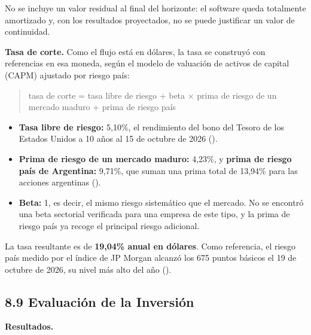 No se incluye un valor residual al final del horizonte: el software
queda totalmente amortizado y, con los resultados proyectados, no se
puede justificar un valor de continuidad.

\textbf{Tasa de corte.} Como el flujo está en dólares, la tasa se
construyó con referencias en esa moneda, según el modelo de valuación de
activos de capital (CAPM) ajustado por riesgo país:

\begin{quote}
tasa de corte = tasa libre de riesgo + beta × prima de riesgo de un
mercado maduro + prima de riesgo país
\end{quote}

\begin{itemize}
\tightlist
\item
  \textbf{Tasa libre de riesgo:} 5,10\%, el rendimiento del bono del
  Tesoro de los Estados Unidos a 10 años al 15 de octubre de 2026
  ().
\item
  \textbf{Prima de riesgo de un mercado maduro:} 4,23\%, y \textbf{prima
  de riesgo país de Argentina:} 9,71\%, que suman una prima total de
  13,94\% para las acciones argentinas
  ().
\item
  \textbf{Beta:} 1, es decir, el mismo riesgo sistemático que el
  mercado. No se encontró una beta sectorial verificada para una empresa
  de este tipo, y la prima de riesgo país ya recoge el principal riesgo
  adicional.
\end{itemize}

La tasa resultante es de \textbf{19,04\% anual en dólares}. Como
referencia, el riesgo país medido por el índice de JP Morgan alcanzó los
675 puntos básicos el 19 de octubre de 2026, su nivel más alto del año
().

\subsection*{8.9 Evaluación de la
Inversión}\label{evaluaciuxf3n-de-la-inversiuxf3n}

\textbf{Resultados.}

